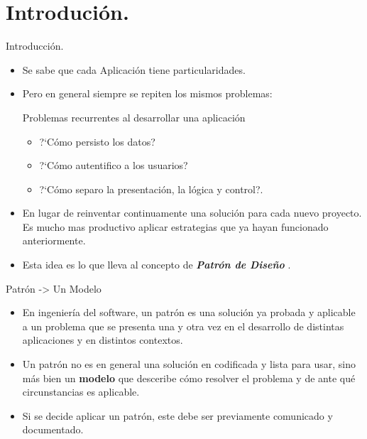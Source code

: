 \section{Introduci\'on.}

\begin{frame}{Introducci\'on.}
	\begin{itemize}
		\item Se sabe que cada Aplicaci\'on tiene particularidades.
		\item Pero en general  siempre se repiten los mismos problemas:
			\begin{block}{Problemas recurrentes al desarrollar una aplicaci\'on}
			\begin{itemize}
				\item ?`C\'omo persisto los datos?
				\item ?`C\'omo autentifico a los usuarios?
				\item ?`C\'omo separo la presentaci\'on, la l\'ogica y control?.
			\end{itemize}
		\end{block}
					\item En lugar de reinventar continuamente una soluci\'on para cada nuevo proyecto. Es mucho mas
					productivo aplicar estrategias que ya hayan funcionado anteriormente.
					\item Esta idea es lo que lleva al concepto de \textit{ \textbf{Patr\'on de Diseño} }.
	\end{itemize}
\end{frame}

\begin{frame}{Patr\'on -> Un Modelo}
	\begin{itemize}
		\item En ingenier\'ia del software, un	patr\'on es una soluci\'on ya probada y aplicable a un
		problema que se presenta una y otra vez en el desarrollo de distintas aplicaciones y en
		distintos contextos.
		\item Un patr\'on no es en general una soluci\'on en codificada y lista para usar, sino más bien un \textbf{modelo}
		que desceribe c\'omo resolver el problema y de ante qu\'e circunstancias es aplicable.
		\item Si se decide aplicar un patr\'on, este debe ser previamente comunicado y documentado.
	\end{itemize}
\end{frame}

